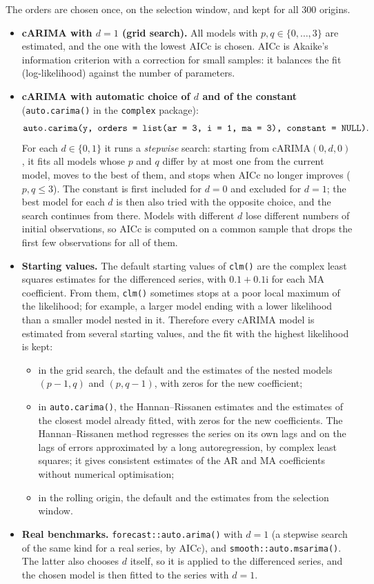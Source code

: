 \documentclass[11pt,a4paper]{article}
\newcommand{\iu}{\mathrm{i}}
\newcommand{\code}[1]{\texttt{#1}}
\begin{document}
The orders are chosen once, on the selection window, and kept for all 300 origins.
\begin{itemize}
  \item \textbf{cARIMA with $d = 1$ (grid search).} All models with $p, q \in \{0, \dots, 3\}$ are
    estimated, and the one with the lowest AICc is chosen. AICc is Akaike's information criterion
    with a correction for small samples: it balances the fit (log-likelihood) against the number
    of parameters.
  \item \textbf{cARIMA with automatic choice of $d$ and of the constant} (\code{auto.carima()} in
    the \code{complex} package):
    \[
      \text{\code{auto.carima(y, orders = list(ar = 3, i = 1, ma = 3), constant = NULL)}}.
    \]
    For each $d \in \{0, 1\}$ it runs a \emph{stepwise} search: starting from cARIMA$(0,d,0)$, it
    fits all models whose $p$ and $q$ differ by at most one from the current model, moves to the
    best of them, and stops when AICc no longer improves ($p, q \le 3$). The constant is first
    included for $d = 0$ and excluded for $d = 1$; the best model for each $d$ is then also tried
    with the opposite choice, and the search continues from there. Models with different $d$ lose
    different numbers of initial observations, so AICc is computed on a common sample that drops
    the first few observations for all of them.
  \item \textbf{Starting values.} The default starting values of \code{clm()} are the complex
    least squares estimates for the differenced series, with $0.1 + 0.1\iu$ for each MA
    coefficient. From them, \code{clm()} sometimes stops at a poor local maximum of the likelihood;
    for example, a larger model ending with a lower likelihood than a smaller model nested in it.
    Therefore every cARIMA model is estimated from several starting values, and the fit with the
    highest likelihood is kept:
    \begin{itemize}
      \item in the grid search, the default and the estimates of the nested models
        $(p-1, q)$ and $(p, q-1)$, with zeros for the new coefficient;
      \item in \code{auto.carima()}, the Hannan--Rissanen estimates and the estimates of the
        closest model already fitted, with zeros for the new coefficients. The Hannan--Rissanen
        method regresses the series on its own lags and on the lags of errors approximated by a
        long autoregression, by complex least squares; it gives consistent estimates of the AR and
        MA coefficients without numerical optimisation;
      \item in the rolling origin, the default and the estimates from the selection window.
    \end{itemize}
  \item \textbf{Real benchmarks.} \code{forecast::auto.arima()} with $d = 1$ (a stepwise search of
    the same kind for a real series, by AICc), and \code{smooth::auto.msarima()}. The latter also
    chooses $d$ itself, so it is applied to the differenced series, and the chosen model is then
    fitted to the series with $d = 1$.
\end{itemize}
\end{document}
